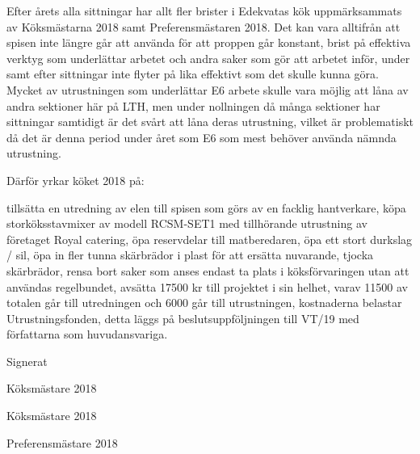 \documentclass[../_main/handlingar.tex]{subfiles}
\begin{document}
Efter årets alla sittningar har allt fler brister i Edekvatas kök uppmärksammats av
Köksmästarna 2018 samt Preferensmästaren 2018. Det kan vara alltifrån att spisen inte
längre går att använda för att proppen går konstant, brist på effektiva verktyg som
underlättar arbetet och andra saker som gör att arbetet inför, under samt efter sittningar inte
flyter på lika effektivt som det skulle kunna göra.
Mycket av utrustningen som underlättar E6 arbete skulle vara möjlig att låna av andra
sektioner här på LTH, men under nollningen då många sektioner har sittningar samtidigt är
det svårt att låna deras utrustning, vilket är problematiskt då det är denna period under året
som E6 som mest behöver använda nämnda utrustning.

Därför yrkar köket 2018 på:

\begin{attsatser}
\att tillsätta en utredning av elen till spisen som görs av en facklig hantverkare,
\att köpa storköksstavmixer av modell RCSM-SET1 med tillhörande utrustning av företaget
Royal catering,
\att öpa reservdelar till matberedaren,
\att öpa ett stort durkslag / sil,
\att öpa in fler tunna skärbrädor i plast för att ersätta nuvarande, tjocka skärbrädor,
\att rensa bort saker som anses endast ta plats i köksförvaringen utan att användas
regelbundet,
\att avsätta 17500 kr till projektet i sin helhet, varav 11500 av totalen går till utredningen och
6000 går till utrustningen,
\att kostnaderna belastar Utrustningsfonden,
\att detta läggs på beslutsuppföljningen till VT/19 med författarna som huvudansvariga.
\end{attsatser}
\begin{signatures}{3}
    Signerat
    \signature{Fredrik Berg}{Köksmästare 2018}
    \signature{Filip Larsson}{Köksmästare 2018}
    \signature{Y Nhi Pham}{Preferensmästare 2018}

\end{signatures}
\end{document}
